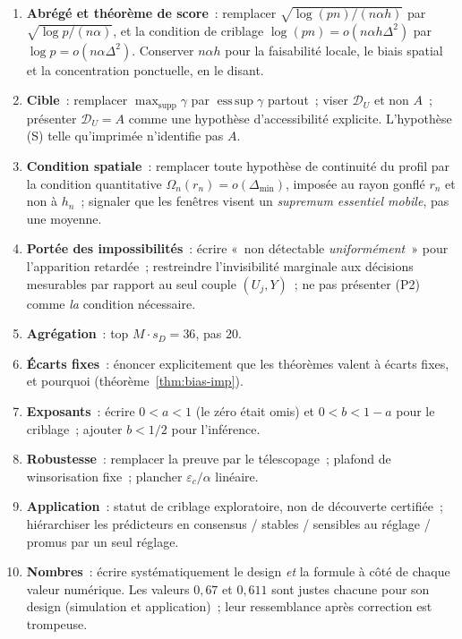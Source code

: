 \documentclass[11pt]{article}
\theoremstyle{plain}
\theoremstyle{definition}
\theoremstyle{remark}
\DeclareMathOperator*{\esssup}{ess\,sup}
\DeclareMathOperator{\supp}{supp}
\newcommand{\1}{\mathbf 1}
\newcommand{\D}{\mathcal D_U}
\begin{document}
\begin{enumerate}[leftmargin=2em,itemsep=4pt]
\item \textbf{Abrégé et théorème de score}~: remplacer
$\sqrt{\log(pn)/(n\alpha h)}$ par $\sqrt{\log p/(n\alpha)}$, et la
condition de criblage $\log(pn)=o(n\alpha h\Delta^2)$ par
$\log p=o(n\alpha\Delta^2)$. Conserver $n\alpha h$ pour la faisabilité
locale, le biais spatial et la concentration ponctuelle, en le disant.
\item \textbf{Cible}~: remplacer $\max_{\supp}\gamma$ par
$\esssup\gamma$ partout~; viser $\D$ et non $A$~; présenter $\D=A$ comme
une hypothèse d'accessibilité explicite. L'hypothèse (S) telle
qu'imprimée n'identifie pas $A$.
\item \textbf{Condition spatiale}~: remplacer toute hypothèse de
continuité du profil par la condition quantitative
$\Omega_n(r_n)=o(\Delta_{\min})$, imposée au rayon gonflé $r_n$ et non à
$h_n$~; signaler que les fenêtres visent un \emph{supremum essentiel
mobile}, pas une moyenne.
\item \textbf{Portée des impossibilités}~: écrire «~non détectable
\emph{uniformément}~» pour l'apparition retardée~; restreindre
l'invisibilité marginale aux décisions mesurables par rapport au seul
couple $(U_j,Y)$~; ne pas présenter (P2) comme \emph{la} condition
nécessaire.
\item \textbf{Agrégation}~: top $M\cdot s_D=36$, pas $20$.
\item \textbf{Écarts fixes}~: énoncer explicitement que les théorèmes
valent à écarts fixes, et pourquoi (théorème~\ref{thm:bias-imp}).
\item \textbf{Exposants}~: écrire $0<a<1$ (le zéro était omis) et
$0<b<1-a$ pour le criblage~; ajouter $b<1/2$ pour l'inférence.
\item \textbf{Robustesse}~: remplacer la preuve par le télescopage~;
plafond de winsorisation fixe~; plancher $\varepsilon_c/\alpha$ linéaire.
\item \textbf{Application}~: statut de criblage exploratoire, non de
découverte certifiée~; hiérarchiser les prédicteurs en consensus /
stables / sensibles au réglage / promus par un seul réglage.
\item \textbf{Nombres}~: écrire systématiquement le design \emph{et} la
formule à côté de chaque valeur numérique. Les valeurs $0{,}67$ et
$0{,}611$ sont justes chacune pour son design (simulation et
application)~; leur ressemblance après correction est trompeuse.
\end{enumerate}
\end{document}
